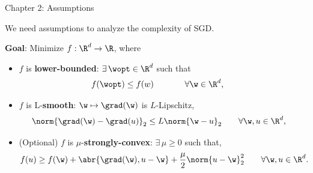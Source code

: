 \documentclass[mathserif,notheorems, hyperref={colorlinks, citecolor=blue, urlcolor=blue, linkcolor=blue}]{beamer}
\begin{document}

    \begin{frame}{Chapter 2: Assumptions}
        \begin{center}
            We need assumptions to analyze the complexity of SGD. 
        \end{center}
       
        \vspace{1.5ex}

        \textbf{Goal}: Minimize \( f : \R^d \rightarrow \R \), where
        \vspace{0.5ex}
        \begin{itemize}
            \item \( f \) is \textbf{lower-bounded}: \( \exists \, \wopt \in \R^d \) such that
                \begin{align*}
                    f(\wopt) &\leq f(w) \hspace{1.7em} \tag*{\(\forall \w \in \R^d \), } 
                \end{align*}

            \item \( f \) is L-\textbf{smooth}: \( \w \mapsto \grad(\w) \) is \( L \)-Lipschitz, 
                \begin{align*}
                    \norm{\grad(\w) - \grad(u)}_2 &\leq L \norm{\w - u}_2 \tag*{\(\forall \w, u \in \R^d \),} 
                \end{align*}

            \item (Optional) \( f \) is \( \mu \)-\textbf{strongly-convex}: \( \exists \, \mu \geq 0 \) such that, 
                \begin{align*}
                   f(u) \geq f(\w) + \abr{\grad(\w), u - \w} + \frac{\mu}{2} \norm{u - \w}^2_2 \tag*{\( \forall \w, u \in \R^d \).}
                \end{align*}
        \end{itemize}
     
    \end{frame}
\end{document}
